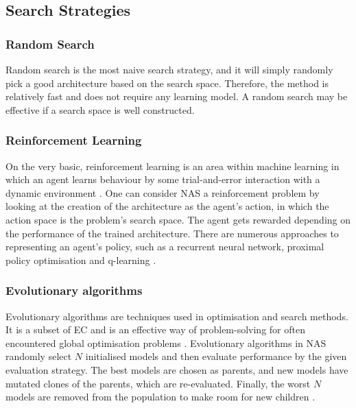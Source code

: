 \subsection{Search Strategies}

\subsubsection{Random Search}
Random search is the most naive search strategy, and it will simply randomly pick a good architecture based on the search space. Therefore, the method is relatively fast and does not require any learning model. A random search may be effective if a search space is well constructed.  

\subsubsection{Reinforcement Learning}
On the very basic, reinforcement learning is an area within machine learning in which an agent learns behaviour by some trial-and-error interaction with a dynamic environment \autocite{kaelbling1996reinforcement}. One can consider \gls{NAS} a reinforcement problem by looking at the creation of the architecture as the agent's action, in which the action space is the problem's search space. The agent gets rewarded depending on the performance of the trained architecture. There are numerous approaches to representing an agent's policy, such as a recurrent neural network, proximal policy optimisation and q-learning \autocite{elsken2019neural}. 

\subsubsection{Evolutionary algorithms}
Evolutionary algorithms are techniques used in optimisation and search methods. It is a subset of \gls{EC} and is an effective way of problem-solving for often encountered global optimisation problems \autocite{7955308}. Evolutionary algorithms in \gls{NAS} randomly select $N$ initialised models and then evaluate performance by the given evaluation strategy. The best models are chosen as parents, and new models have mutated clones of the parents, which are re-evaluated. Finally, the worst $N$ models are removed from the population to make room for new children \autocite{https://doi.org/10.48550/arxiv.1703.01041}. 

